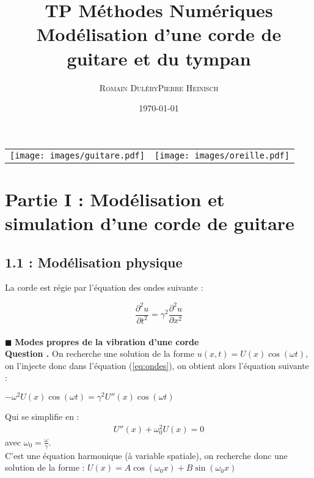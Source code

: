 \documentclass[a4,12pt]{article}
\title{\textbf{TP Méthodes Numériques \\ Modélisation d'une corde de guitare et du tympan}}
\author{
\begin{tabular}{cc}
	\textsc{Romain Duléry} & \textsc{Pierre Heinisch} \\
\end{tabular}}
\date{\small \today}
\newcounter{Nbquestion}
\newcommand*\question{%
\stepcounter{Nbquestion}%
\textbf{Question \theNbquestion. }}
\begin{document}
\maketitle

\begin{center}
	\begin{tabular}{cc} 
		\texttt{[image: images/guitare.pdf]} & 
		\texttt{[image: images/oreille.pdf]} 
	\end{tabular}
\end{center}


\section*{Partie I : Modélisation et simulation d'une corde de guitare}
\subsection*{1.1 : Modélisation physique}

La corde est régie par l'équation des ondes suivante :

\begin{equation}
	\frac{\partial ^2u}{\partial t^2}=\gamma^2\frac{\partial ^2u}{\partial x^2}
	\label{eq:ondes}
\end{equation}\\

\indent $\blacksquare$ \textbf{Modes propres de la vibration d'une corde}\\


\question On recherche une solution de la forme $u(x,t)=U(x)\cos(\omega t)$, on l'injecte donc dans l'équation (\ref{eq:ondes}), on obtient alors l'équation suivante :\\
\begin{center}
  $-\omega^2  U(x)\cos(\omega t) = \gamma^2 U''(x) \cos(\omega t)$
\end{center}
Qui se simplifie en :
\begin{eqnarray}
    U''(x) + \omega_0^2 U(x) = 0
\end{eqnarray}
avec $\omega_0 = \frac{\omega}{\gamma}$.\\

C'est une équation harmonique (à variable spatiale), on recherche donc une solution de la forme : $U(x) = A \cos(\omega_0 x) + B \sin(\omega_0 x)$\\
\end{document}
